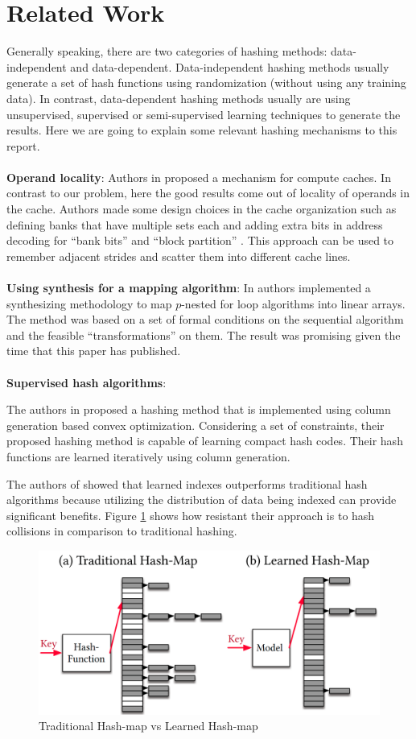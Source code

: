 \section{Related Work}
\label{related_work}
Generally speaking, there are two categories of hashing methods: data-independent and data-dependent. Data-independent hashing methods usually generate a set of hash functions using randomization (without using any training data). In contrast,  data-dependent hashing methods usually are using unsupervised, supervised or semi-supervised learning techniques to generate the results. Here we are going to explain some relevant hashing mechanisms to this report. 
\\
~
\\
\textbf{Operand locality}: Authors in \cite{compute-caches} proposed a mechanism for compute caches. In contrast to our problem, here the good results come out of locality of operands in the cache. Authors made some design choices in the cache organization such as defining banks that
have multiple sets each and adding extra bits in address decoding for ``bank bits'' and ``block partition'' \cite{compute-caches}. This approach can be used to remember adjacent strides and scatter them into different cache lines.
\\
~
\\
\textbf{Using synthesis for a mapping algorithm}: In \cite{synthesis-map} authors implemented a synthesizing methodology to map $p$-nested for loop algorithms into linear arrays. The method was based on a set of formal conditions on the sequential algorithm and the feasible ``transformations'' on them. The result was promising given the time that this paper has published.
\\
~
\\
\textbf{Supervised hash algorithms}:

The authors in \cite{learning-hash} proposed a hashing method that is implemented using column generation based convex optimization. Considering a set of constraints, their proposed hashing method is capable of learning compact hash codes. Their hash functions are learned iteratively using column generation.

The authors of \cite{learning-index} showed that learned indexes outperforms traditional hash algorithms because utilizing the distribution of data being indexed can provide significant benefits. Figure \ref{fig:learned_index} shows how resistant their approach is to hash collisions in comparison to traditional hashing. 

\begin{figure}[h!]
	\includegraphics[scale=0.2]{figures/learned_index.png}
	\caption{Traditional Hash-map vs Learned Hash-map \cite{learning-index}}
	\label{fig:learned_index}
\end{figure}

\vspace{1mm}
\noindent

